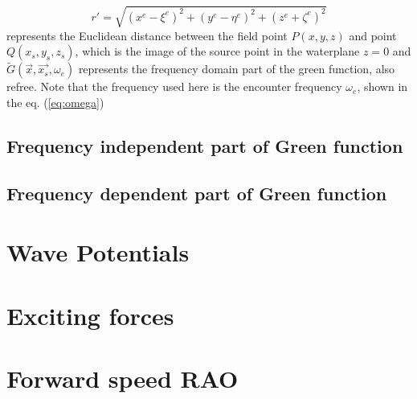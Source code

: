 \begin{equation}
    r' = \sqrt{(x^e - \xi^e)^2 + (y^e - \eta^e)^2 + (z^e + \zeta^e)^2}   
\end{equation}
represents the Euclidean distance between the field point $P(x, y, z)$ and point $Q(x_s, y_s, z_s)$, which is the image of the source point in the waterplane $z=0$ and $\tilde{G}(\vec{x}, \vec{x_s}, \omega_e)$ represents the frequency domain part of the green function, also refree. Note that the frequency used here is the encounter frequency $\omega_e$, shown in the eq. (\ref{eq:omega})

\subsection{Frequency independent part of Green function}

\subsection{Frequency dependent part of Green function}
\section{Wave Potentials}
\section{Exciting forces}
\section{Forward speed RAO}